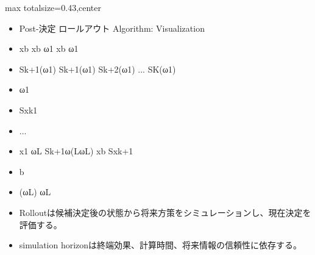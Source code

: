 \clearpage
{}
\begin{minipage}[t]{0.405\textwidth}
\begin{adjustbox}{max totalsize={\textwidth}{0.43\textheight},center}
\begin{minipage}{\textwidth}\scriptsize
{}\begin{itemize}
\item Post-決定 ロールアウト Algorithm: Visualization
\item xb xb ω1 xb ω1
\item Sk+1(ω1) Sk+1(ω1) Sk+2(ω1) ... SK(ω1)
\item ω1
\item Sxk1
\item ...
\item x1 ωL Sk+1ω(LωL) xb Sxk+1
\item b
\item (ωL) ωL
\end{itemize}\begin{itemize}
\item Rolloutは候補決定後の状態から将来方策をシミュレーションし、現在決定を評価する。
\item simulation horizonは終端効果、計算時間、将来情報の信頼性に依存する。
\end{itemize}
\end{minipage}
\end{adjustbox}
\end{minipage}\hfill
